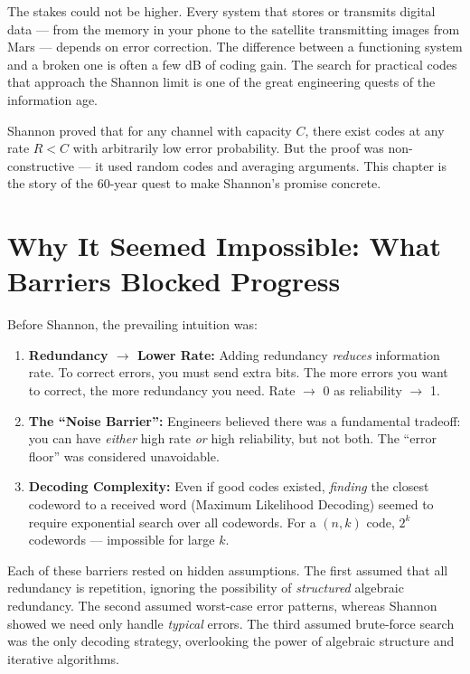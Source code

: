 The stakes could not be higher. Every system that stores or transmits digital data — from the memory in your phone to the satellite transmitting images from Mars — depends on error correction. The difference between a functioning system and a broken one is often a few dB of coding gain. The search for practical codes that approach the Shannon limit is one of the great engineering quests of the information age.

Shannon proved that for any channel with capacity $C$, there exist codes at any rate $R < C$ with arbitrarily low error probability. But the proof was non-constructive — it used random codes and averaging arguments. This chapter is the story of the 60-year quest to make Shannon's promise concrete.

\section{Why It Seemed Impossible: What Barriers Blocked Progress}
\label{sec:ec:impossible}

Before Shannon, the prevailing intuition was:

\begin{enumerate}
\item \textbf{Redundancy $\to$ Lower Rate:} Adding redundancy \emph{reduces} information rate. To correct errors, you must send extra bits. The more errors you want to correct, the more redundancy you need. Rate $\to$ 0 as reliability $\to$ 1.

\item \textbf{The ``Noise Barrier'':} Engineers believed there was a fundamental tradeoff: you can have \emph{either} high rate \emph{or} high reliability, but not both. The ``error floor'' was considered unavoidable.

\item \textbf{Decoding Complexity:} Even if good codes existed, \emph{finding} the closest codeword to a received word (Maximum Likelihood Decoding) seemed to require exponential search over all codewords. For a $(n,k)$ code, $2^k$ codewords — impossible for large $k$.
\end{enumerate}

Each of these barriers rested on hidden assumptions. The first assumed that all redundancy is repetition, ignoring the possibility of \emph{structured} algebraic redundancy. The second assumed worst-case error patterns, whereas Shannon showed we need only handle \emph{typical} errors. The third assumed brute-force search was the only decoding strategy, overlooking the power of algebraic structure and iterative algorithms.

